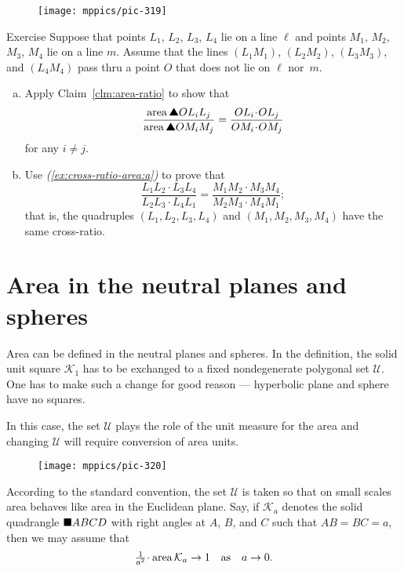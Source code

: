 {\begin{wrapfigure}[5]{r}{40 mm}
\vskip-6mm
\centering
\texttt{[image: mppics/pic-319]}
\end{wrapfigure}

\begin{thm}{Exercise}\label{ex:cross-ratio-area}
Suppose that points $L_1$, $L_2$, $L_3$, $L_4$ lie on a line $\ell$ 
and points $M_1$, $M_2$, $M_3$, $M_4$ lie on a line $m$. 
Assume that the lines $(L_1M_1)$, $(L_2M_2)$, $(L_3M_3)$, and $(L_4M_4)$ pass thru a point $O$ that does not lie on $\ell$ nor~$m$.

\begin{enumerate}[(a)]
 \item\label{ex:cross-ratio-area:a} Apply Claim~\ref{clm:area-ratio} to show that
 \[\frac{\area\solidtriangle OL_iL_j}{\area\solidtriangle OM_iM_j}=\frac{OL_i\cdot OL_j}{OM_i\cdot OM_j}\]
 for any $i\ne j$.
 \item\label{ex:cross-ratio-area:b} Use \textit{(\ref{ex:cross-ratio-area:a})} to prove that 
 \[\frac{L_1L_2\cdot L_3L_4}{L_2L_3\cdot L_4L_1}=\frac{M_1M_2\cdot M_3M_4}{M_2M_3\cdot M_4M_1};\]
 that is, the quadruples $(L_1, L_2, L_3, L_4)$ and $(M_1, M_2, M_3, M_4)$ have the same cross-ratio.
 
\end{enumerate}

\end{thm}


\section*{Area in
the neutral planes and spheres}

Area can be defined in the neutral planes and spheres.
In the definition,
the solid unit square $\mathcal{K}_1$ has to be  
exchanged to a fixed nondegenerate polygonal set $\mathcal{U}$.
One has to make such a change for good reason --- 
hyperbolic plane and sphere have no squares.

In this case, the set $\mathcal{U}$ plays the role of the unit measure for the area
and changing $\mathcal{U}$ will require conversion of area units.

\begin{wrapfigure}{o}{26 mm}
\vskip-0mm
\centering
\texttt{[image: mppics/pic-320]}
\end{wrapfigure}

According to the standard convention, the set $\mathcal{U}$
is taken so that on small scales area behaves like area in the Euclidean plane.
Say, 
if $\mathcal{K}_a$ denotes the solid quadrangle $\blacksquare ABCD$ 
with right angles at $A$, $B$, and $C$ such that  $AB=BC=a$, 
then we may assume that
\[\tfrac{1}{a^2}\cdot\area \mathcal{K}_a\to 1
\quad
\text{as}
\quad 
a\to0.\]

}
